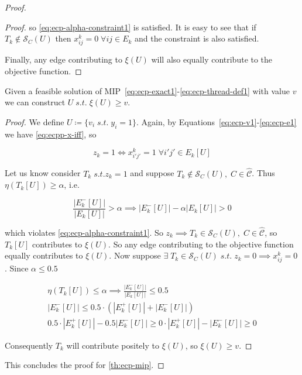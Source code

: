 \begin{proof}
\begin{proof}
		so \autoref{eq:ecp-alpha-constraint1} is satisfied. It is easy to see that
		if $T_k \not\in \mathcal{S}_C(U)$ then $x_{ij}^{k} = 0 \; \forall ij \in E_{k}$ and
		the constraint is also satisfied.

		Finally, any edge contributing to $\xi(U)$ will also
		equally contribute to the objective function.
	\end{proof}

	\begin{claim}
		Given a feasible solution of
		MIP~\ref{eq:ecp-exact1}-\ref{eq:ecp-thread-def1} with value $v$ we can
		construct $U \; s.t. \; \xi(U) \geq v$.
	\end{claim}

	\begin{proof}
		We define $U \coloneqq \{ v_{i} \; s.t. \; y_i = 1\}$. Again, by
		Equations~\ref{eq:ecp-v1}-\ref{eq:ecp-e1} we have
		\autoref{eq:ecpp-x-iff}, so

		\begin{equation}
			z_k = 1 \iff x_{i'j'}^{k} = 1 \; \forall i'j'
			\in E_k[U]
		\end{equation}

		Let us know consider $T_k \; s.t. z_k = 1$ and suppose $T_k \not\in
			\mathcal{S}_C(U), \; C \in \mathcal{\hat{C}}$. Thus $\eta(T_k[U]) \geq \alpha$,
		i.e.

		\begin{equation}
			\frac{|E^{-}_{k}[U]|}{|E_{k}[U]|} > \alpha \implies |E^{-}_{k}[U]| -
			\alpha |E_{k}[U]| > 0
		\end{equation}

		which violates \autoref{eq:ecp-alpha-constraint1}. So $z_k \implies T_k
			\in \mathcal{S}_C(U), \; C \in \mathcal{\hat{C}}$, so $T_k[U]$ contributes to
		$\xi(U)$. So any edge contributing to the objective function equally
		contributes to $\xi(U)$. Now suppose $\exists \; T_k \in \mathcal{S}_C(U) \; s.t.
			\; z_k = 0 \implies x_{ij}^{k} = 0$. Since $\alpha \leq 0.5$

		\begin{gather*}
			\eta(T_k[U]) \leq \alpha \implies \frac{|E^{-}_{k}[U]|}{|E_{k}[U]|}
			\leq 0.5 \\
			|E^{-}_{k}[U]| \leq 0.5 \cdot (|E^{+}_{k}[U]| + |E^{-}_{k}[U]|) \\
			0.5 \cdot |E^{+}_{k}[U]| - 0.5 |E^{-}_{k}[U]| \geq 0
			\cdot |E^{+}_{k}[U]| - |E^{-}_{k}[U]| \geq 0
		\end{gather*}

		Consequently $T_k$ will contribute positely to $\xi(U)$, so $\xi(U)
			\geq v$.
	\end{proof}

	This concludes the proof for \autoref{th:ecp-mip}.
\end{proof}

